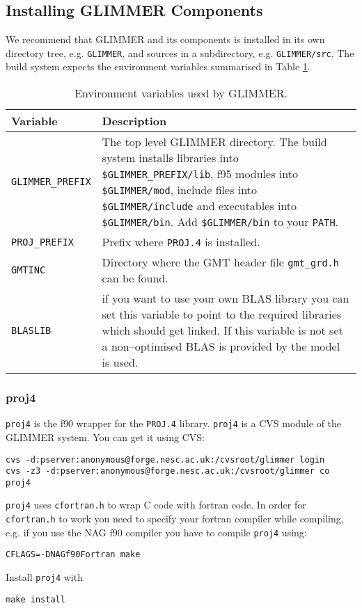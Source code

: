 \subsection{Installing GLIMMER Components}
We recommend that GLIMMER and its components is installed in its own directory tree, e.g. \texttt{GLIMMER}, and sources in a subdirectory, e.g. \texttt{GLIMMER/src}. The build system expects the environment variables summarised in Table \ref{ug.tab.env}.

\begin{table}[htbp]
  \centering
  \begin{tabular}{|l|p{10cm}|}
    \hline
    Variable & Description \\
    \hline
    \hline
    \texttt{GLIMMER\_PREFIX} & The top level GLIMMER directory. The build system installs libraries into \texttt{\$GLIMMER\_PREFIX/lib}, f95 modules into \texttt{\$GLIMMER/mod}, include files into \texttt{\$GLIMMER/include} and executables into \texttt{\$GLIMMER/bin}. Add \texttt{\$GLIMMER/bin} to your \texttt{PATH}.\\
    \hline
    \texttt{PROJ\_PREFIX} & Prefix where \texttt{PROJ.4} is installed. \\
    \hline
    \texttt{GMTINC} & Directory where the GMT header file \texttt{gmt\_grd.h} can be found.\\
    \hline
    \texttt{BLASLIB} & if you want to use your own BLAS library you can set this variable to point to the required libraries which should get linked. If this variable is not set a non--optimised BLAS is provided by the model is used.\\
    \hline
  \end{tabular}
  \caption{Environment variables used by GLIMMER.}
  \label{ug.tab.env}
\end{table}

\subsubsection{proj4}
\texttt{proj4} is the f90 wrapper for the \texttt{PROJ.4} library. \texttt{proj4} is a CVS module of the GLIMMER system. You can get it using CVS:
{\small
\begin{verbatim}
cvs -d:pserver:anonymous@forge.nesc.ac.uk:/cvsroot/glimmer login
cvs -z3 -d:pserver:anonymous@forge.nesc.ac.uk:/cvsroot/glimmer co proj4
\end{verbatim}}

\texttt{proj4} uses \texttt{cfortran.h} to wrap C code with fortran code. In order for \texttt{cfortran.h} to work you need to specify your fortran compiler while compiling, e.g. if you use the NAG f90 compiler you have to compile \texttt{proj4} using:
{\small
\begin{verbatim}
CFLAGS=-DNAGf90Fortran make
\end{verbatim}}
Install \texttt{proj4} with
{\small
\begin{verbatim}
make install
\end{verbatim}}

